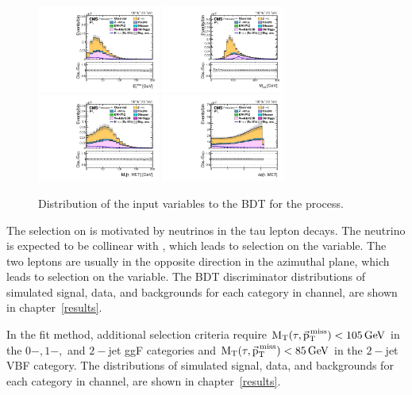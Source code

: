 \begin{figure}[htbp!]
  \includegraphics[width=0.36\textwidth]{plots/chapter6/mutau/type1_pfMetEt.pdf}
  \includegraphics[width=0.36\textwidth]{plots/chapter6/mutau/m_t_CollinearMass.pdf}\\
  \includegraphics[width=0.36\textwidth]{plots/chapter6/mutau/MTTauMET.pdf}
  \includegraphics[width=0.36\textwidth]{plots/chapter6/mutau/dPhiTauMET.pdf}\\
  \caption{Distribution of the input variables to the BDT for the \muhad process.}
  \label{fig:input_mt}
\end{figure}

The selection on \ptvecmiss is motivated by neutrinos in the tau lepton decays. The neutrino is expected to be collinear with \tauh, which leads to selection on the \dphitauhmet variable. The two leptons are usually in the opposite direction in the azimuthal plane, which leads to selection on the \dphimtauh variable. The BDT discriminator distributions of simulated signal, data, and backgrounds for each category in \muhad channel, are shown in chapter~\ref{results}.

In the \mcol fit method, additional selection criteria require $\text{M}_\mathrm{T}(\tau,{\vec{\text{p}}}_{\mathrm{T}}^{\kern1pt\text{miss}}) < 105 \,\text{Ge\hspace{-.08em}V}$ in the $0-, 1-,$ and $2-$jet ggF categories and $\text{M}_\mathrm{T}(\tau,{\vec{\text{p}}}_{\mathrm{T}}^{\kern1pt\text{miss}}) < 85 \,\text{Ge\hspace{-.08em}V}$ in the $2-$jet VBF category. The \mcol distributions of simulated signal, data, and backgrounds for each category in \muhad channel, are shown in chapter~\ref{results}.

